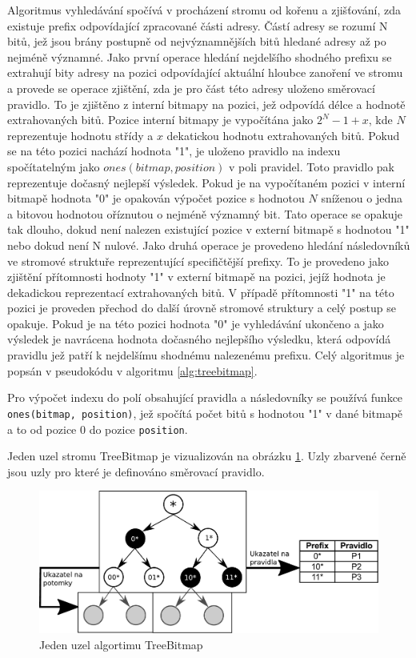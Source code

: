 Algoritmus vyhledávání spočívá v procházení stromu od kořenu a zjišťování, zda
existuje prefix odpovídající zpracované části adresy. Částí adresy se rozumí N bitů, jež jsou brány postupně
od nejvýznamnějších bitů hledané adresy až po nejméně významné.
Jako první operace hledání nejdelšího shodného prefixu se extrahují bity adresy na pozici odpovídající
aktuální hloubce zanoření ve stromu a provede se operace zjištění, zda je pro část této adresy uloženo
směrovací pravidlo. To je zjištěno z interní bitmapy na pozici, jež odpovídá délce a hodnotě extrahovaných bitů.
Pozice interní bitmapy je vypočítána jako $2^{N} - 1 + x$, kde $N$ reprezentuje hodnotu střídy a $x$
dekatickou hodnotu extrahovaných bitů.
Pokud se na této pozici
nachází hodnota "1", je uloženo pravidlo na indexu spočítatelným jako $ones(bitmap, position)$ v poli pravidel.
Toto pravidlo pak reprezentuje dočasný nejlepší výsledek. Pokud je na vypočítaném
pozici v interní bitmapě hodnota "0" je opakován výpočet pozice s hodnotou $N$ sníženou o jedna a bitovou hodnotou
oříznutou o nejméně významný bit. Tato operace se opakuje tak dlouho, dokud není nalezen existující pozice
v externí bitmapě s hodnotou "1"
nebo dokud není N nulové. Jako druhá operace je provedeno hledání následovníků ve stromové struktuře
reprezentující specifičtější prefixy. To je provedeno jako zjištění přítomnosti hodnoty "1" v externí
bitmapě na pozici, jejíž hodnota je dekadickou reprezentací extrahovaných bitů. V případě přítomnosti
"1" na této pozici je proveden přechod do další úrovně stromové struktury a celý postup se opakuje.
Pokud je na této pozici hodnota "0" je vyhledávání ukončeno a jako výsledek je navrácena hodnota
dočasného nejlepšího výsledku, která odpovídá pravidlu jež patří k nejdelšímu shodnému nalezenému
prefixu. Celý algoritmus je popsán v pseudokódu v algoritmu \ref{alg:treebitmap}.

Pro výpočet indexu do polí obsahující pravidla a následovníky se používá funkce
\texttt{ones(bitmap, position)}, jež
spočítá počet bitů s hodnotou "1" v dané bitmapě a to od pozice 0 do pozice \texttt{position}.

Jeden uzel stromu TreeBitmap je vizualizován na obrázku \ref{fig:tbm-node}. Uzly zbarvené černě
jsou uzly pro které je definováno směrovací pravidlo.

\begin{figure}[!htbp]
	\label{fig:tbm-node}
	\centering
	\includegraphics[scale=.55]{fig/tbm.pdf}
	\caption{Jeden uzel algortimu TreeBitmap}
\end{figure}

